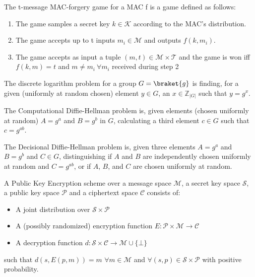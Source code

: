 \documentclass[a4paper,german]{article}
\newenvironment{customdef}[1]{\renewcommand\theinnercustomdef{#1}\innercustomdef}{\endinnercustomdef}
\begin{document}
\begin{customdef}{3.7}
	The t-message MAC-forgery game for a MAC f is a game defined as follows:

	\begin{enumerate}

		\item  The game samples a secret key $k \in \mathcal{K}$ according to the MAC's distribution.
		\item  The game accepts up to t inputs $m_i \in \mathcal{M}$ and outputs $f(k, m_i)$.
		\item  The game accepts as input a tuple $(m, t) \in \mathcal{M \times T}$ and the game is won iff  $f(k, m) = t$ and $m \neq m_i ~ \forall m_i$ received during step 2

	\end{enumerate}
\end{customdef}

\begin{customdef}{3.8}
	The discrete logarithm problem for a group $G = \braket{g}$ is finding, for a given (uniformly at random chosen) element $y \in G$, an $x \in \mathbb{Z}_{|G|}$ such that $y = g^x$.
\end{customdef}

\begin{customdef}{3.9}
	The Computational Diffie-Hellman problem is, given elements (chosen uniformly at random) $A = g^a$ and $B = g^b$ in $G$, calculating a third element $c \in G$ such that $c = g^{ab}$.
\end{customdef}

\begin{customdef}{3.10}
	The Decisional Diffie-Hellman problem is, given three elements  $A = g^a$ and $B = g^b$ and $C \in G$, distinguishing if $A$ and $B$ are independently chosen uniformly at random and $C = g^{ab}$, or if $A$, $B$, and $C$ are chosen uniformly at random.
\end{customdef}

\begin{customdef}{3.11}
	A Public Key Encryption scheme over a message space $\mathcal{M}$, a secret key space $\mathcal{S}$, a public key space $\mathcal{P}$ and a ciphertext space $\mathcal{C}$ consists of:

	\begin{itemize}

		\item  A joint distribution over $\mathcal{S \times P}$
		\item  A (possibly randomized) encryption function $E: \mathcal{P \times M} \rightarrow \mathcal{C}$
		\item  A decryption function $d: \mathcal{S \times C} \rightarrow \mathcal{M} \cup \{\bot\}$
	\end{itemize}
	such that $d(s, E(p, m)) = m$ $\forall m \in \mathcal{M}$ and $\forall (s, p) \in \mathcal{S \times P}$ with positive probability.
\end{customdef}
\end{document}
